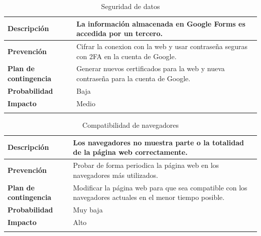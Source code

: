 \documentclass{report}
\begin{document}
        \begin{center}
            \begin{longtable}{|p{6cm}|p{6cm}|}
                \hline
                \textbf{Descripción} & La información almacenada en Google Forms es accedida por un tercero.\\
                \hline
                \textbf{Prevención} & Cifrar la conexion con la web y usar contraseña seguras con 2FA en la cuenta de Google.\\
                \hline
                \textbf{Plan de contingencia} & Generar nuevos certificados para la web y nueva contraseña para la cuenta de Google.\\
                \hline
                \textbf{Probabilidad} & Baja\\
                \hline
                \textbf{Impacto} & Medio\\
                \hline
                \caption{Seguridad de datos}
            \end{longtable}
        \end{center}
        \clearpage
        \begin{center}
            \begin{longtable}{|p{6cm}|p{6cm}|}
                \hline
                \textbf{Descripción} & Los navegadores no muestra parte o la totalidad de la página web correctamente.\\
                \hline
                \textbf{Prevención} & Probar de forma periodica la página web en los navegadores más utilizados.\\
                \hline
                \textbf{Plan de contingencia} & Modificar la página web para que sea compatible con los navegadores actuales en el menor tiempo posible.\\
                \hline
                \textbf{Probabilidad} & Muy baja\\
                \hline
                \textbf{Impacto} & Alto\\
                \hline
                \caption{Compatibilidad de navegadores}
            \end{longtable}
        \end{center}
\end{document}
